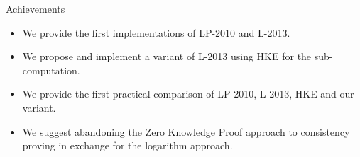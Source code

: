 \documentclass[t, 12pt]{beamer}            %
\begin{document}
\begin{frame}{Achievements}
	\begin{itemize} %
		\item We provide the first implementations of LP-2010 and L-2013.
		\item We propose and implement a variant of L-2013 using HKE for the sub-computation.
		\item We provide the first practical comparison of LP-2010, L-2013, HKE and our variant.
		\item We suggest abandoning the Zero Knowledge Proof approach to consistency proving in exchange for the logarithm approach.
		
	\end{itemize}
\end{frame}
\end{document}
